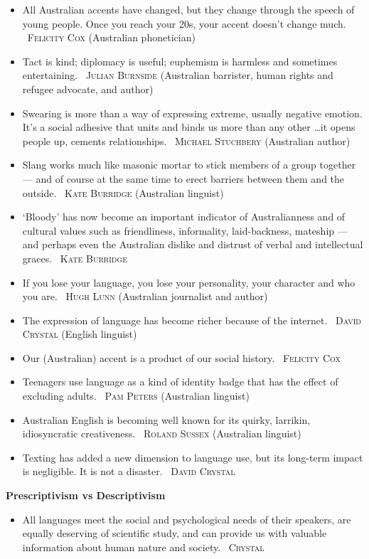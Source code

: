 \documentclass[a4paper]{article}
\newcommand{\heading}[1]{\textbf{#1}}
\newcommand{\linguist}[1]{\textemdash~\textsc{#1}}
\begin{document}
\begin{multicols}{2}
\begin{itemize}
    \item All Australian accents have changed, but they change through the speech of young people. Once you reach your 20s, your accent doesn't change much. \linguist{Felicity Cox} (Australian phonetician)
    \item Tact is kind; diplomacy is useful; euphemism is harmless and sometimes entertaining. \linguist{Julian Burnside} (Australian barrister, human rights and refugee advocate, and author)
    \item Swearing is more than a way of expressing extreme, usually negative emotion. It's a social adhesive that units and binds us more than any other \dots it opens people up, cements relationships. \linguist{Michael Stuchbery} (Australian author)
    \item Slang works much like masonic mortar to stick members of a group together --- and of course at the same time to erect barriers between them and the outside. \linguist{Kate Burridge} (Australian linguist)
    \item `Bloody' has now become an important indicator of Australianness and of cultural values such as friendliness, informality, laid-backness, mateship --- and perhaps even the Australian dislike and distrust of verbal and intellectual graces. \linguist{Kate Burridge}
    \item If you lose your language, you lose your personality, your character and who you are. \linguist{Hugh Lunn} (Australian journalist and author)
    \item The expression of language has become richer because of the internet. \linguist{David Crystal} (English linguist)
    \item Our (Australian) accent is a product of our social history. \linguist{Felicity Cox}
    \item Teenagers use language as a kind of identity badge that has the effect of excluding adults. \linguist{Pam Peters} (Australian linguist)
    \item Australian English is becoming well known for its quirky, larrikin, idiosyncratic creativeness. \linguist{Roland Sussex} (Australian linguist)
    \item Texting has added a new dimension to language use, but its long-term impact is negligible. It is not a disaster. \linguist{David Crystal}
  \end{itemize}
  \heading{Prescriptivism vs Descriptivism}
  \begin{itemize}
    \item All languages meet the social and psychological needs of their speakers, are equally deserving of scientific study, and can provide us with valuable information about human nature and society. \linguist{Crystal}

\end{itemize}
\end{multicols}
\end{document}
